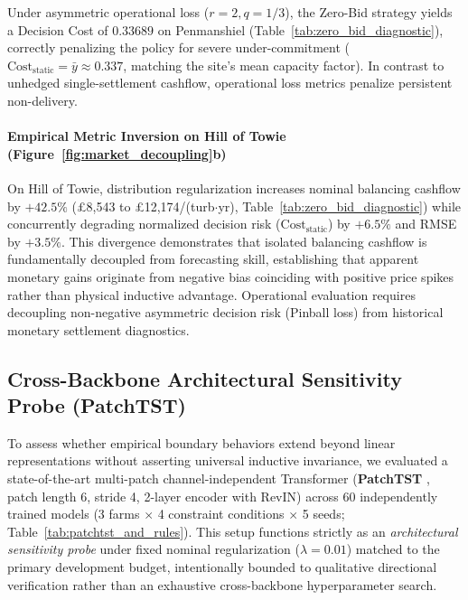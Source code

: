 Under asymmetric operational loss ($r=2, q=1/3$), the Zero-Bid strategy yields a Decision Cost of \textbf{$0.33689$} on Penmanshiel (Table~\ref{tab:zero_bid_diagnostic}), correctly penalizing the policy for severe under-commitment ($\text{Cost}_{\text{static}} = \bar{y} \approx 0.337$, matching the site's mean capacity factor). In contrast to unhedged single-settlement cashflow, operational loss metrics penalize persistent non-delivery.

\paragraph{Empirical Metric Inversion on Hill of Towie (Figure~\ref{fig:market_decoupling}b)}
On Hill of Towie, distribution regularization increases nominal balancing cashflow by $+42.5\%$ (\pounds 8,543 to \pounds 12,174/(turb$\cdot$yr), Table~\ref{tab:zero_bid_diagnostic}) while concurrently degrading normalized decision risk ($\text{Cost}_{\text{static}}$) by \textbf{$+6.5\%$} and RMSE by $+3.5\%$. This divergence demonstrates that isolated balancing cashflow is fundamentally decoupled from forecasting skill, establishing that apparent monetary gains originate from negative bias coinciding with positive price spikes rather than physical inductive advantage. Operational evaluation requires decoupling non-negative asymmetric decision risk (Pinball loss) from historical monetary settlement diagnostics.

\subsection{Cross-Backbone Architectural Sensitivity Probe (PatchTST)}
To assess whether empirical boundary behaviors extend beyond linear representations without asserting universal inductive invariance, we evaluated a state-of-the-art multi-patch channel-independent Transformer (\textbf{PatchTST} \cite{nie2023patchtst}, patch length 6, stride 4, 2-layer encoder with RevIN) across 60 independently trained models (3 farms $\times$ 4 constraint conditions $\times$ 5 seeds; Table~\ref{tab:patchtst_and_rules}). This setup functions strictly as an \textit{architectural sensitivity probe} under fixed nominal regularization ($\lambda=0.01$) matched to the primary development budget, intentionally bounded to qualitative directional verification rather than an exhaustive cross-backbone hyperparameter search.



